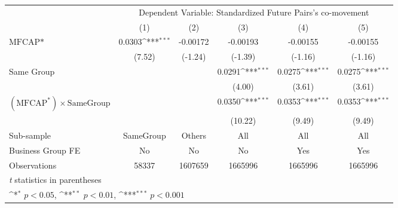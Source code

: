 {
\def\sym#1{\ifmmode^{#1}\else\(^{#1}\)\fi}
\begin{tabular}{l*{5}{c}}
\hline\hline
                &\multicolumn{5}{c}{Dependent Variable: Standardized Future Pairs's co-movement}               \\\cmidrule(lr){2-6}
                &\multicolumn{1}{c}{(1)}         &\multicolumn{1}{c}{(2)}         &\multicolumn{1}{c}{(3)}         &\multicolumn{1}{c}{(4)}         &\multicolumn{1}{c}{(5)}         \\
\hline
$ \text{MFCAP*} $&   0.0303\sym{***}& -0.00172         & -0.00193         & -0.00155         & -0.00155         \\
                &   (7.52)         &  (-1.24)         &  (-1.39)         &  (-1.16)         &  (-1.16)         \\
[1em]
Same Group      &                  &                  &   0.0291\sym{***}&   0.0275\sym{***}&   0.0275\sym{***}\\
                &                  &                  &   (4.00)         &   (3.61)         &   (3.61)         \\
[1em]
 $ (\text{MFCAP}^*) \times {\text{SameGroup} }  $ &                  &                  &   0.0350\sym{***}&   0.0353\sym{***}&   0.0353\sym{***}\\
                &                  &                  &  (10.22)         &   (9.49)         &   (9.49)         \\
\hline
Sub-sample      &SameGroup         &   Others         &      All         &      All         &      All         \\
Business Group FE&       No         &       No         &       No         &      Yes         &      Yes         \\
Observations    &    58337         &  1607659         &  1665996         &  1665996         &  1665996         \\
\hline\hline
\multicolumn{6}{l}{\footnotesize \textit{t} statistics in parentheses}\\
\multicolumn{6}{l}{\footnotesize \sym{*} \(p<0.05\), \sym{**} \(p<0.01\), \sym{***} \(p<0.001\)}\\
\end{tabular}
}
